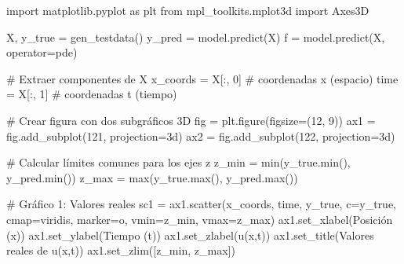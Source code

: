 \documentclass[
  spanish,
  us-letterpaper,
]{scrreprt}
\newenvironment{Shaded}{\begin{snugshade}}{\end{snugshade}}
\newcommand{\BuiltInTok}[1]{\textcolor[rgb]{0.00,0.23,0.31}{#1}}
\newcommand{\CommentTok}[1]{\textcolor[rgb]{0.37,0.37,0.37}{#1}}
\newcommand{\DecValTok}[1]{\textcolor[rgb]{0.68,0.00,0.00}{#1}}
\newcommand{\ImportTok}[1]{\textcolor[rgb]{0.00,0.46,0.62}{#1}}
\newcommand{\NormalTok}[1]{\textcolor[rgb]{0.00,0.23,0.31}{#1}}
\newcommand{\OperatorTok}[1]{\textcolor[rgb]{0.37,0.37,0.37}{#1}}
\newcommand{\StringTok}[1]{\textcolor[rgb]{0.13,0.47,0.30}{#1}}
\theoremstyle{plain}
\theoremstyle{definition}
\theoremstyle{remark}
\begin{document}
\begin{Shaded}
\begin{Highlighting}[]
\ImportTok{import}\NormalTok{ matplotlib.pyplot }\ImportTok{as}\NormalTok{ plt }
\ImportTok{from}\NormalTok{ mpl\_toolkits.mplot3d }\ImportTok{import}\NormalTok{ Axes3D}

\NormalTok{X, y\_true }\OperatorTok{=}\NormalTok{ gen\_testdata()}
\NormalTok{y\_pred }\OperatorTok{=}\NormalTok{ model.predict(X)}
\NormalTok{f }\OperatorTok{=}\NormalTok{ model.predict(X, operator}\OperatorTok{=}\NormalTok{pde)}

\CommentTok{\# Extraer componentes de X}
\NormalTok{x\_coords }\OperatorTok{=}\NormalTok{ X[:, }\DecValTok{0}\NormalTok{]  }\CommentTok{\# coordenadas x (espacio)}
\NormalTok{time }\OperatorTok{=}\NormalTok{ X[:, }\DecValTok{1}\NormalTok{]      }\CommentTok{\# coordenadas t (tiempo)}

\CommentTok{\# Crear figura con dos subgráficos 3D}
\NormalTok{fig }\OperatorTok{=}\NormalTok{ plt.figure(figsize}\OperatorTok{=}\NormalTok{(}\DecValTok{12}\NormalTok{, }\DecValTok{9}\NormalTok{))}
\NormalTok{ax1 }\OperatorTok{=}\NormalTok{ fig.add\_subplot(}\DecValTok{121}\NormalTok{, projection}\OperatorTok{=}\StringTok{\textquotesingle{}3d\textquotesingle{}}\NormalTok{)}
\NormalTok{ax2 }\OperatorTok{=}\NormalTok{ fig.add\_subplot(}\DecValTok{122}\NormalTok{, projection}\OperatorTok{=}\StringTok{\textquotesingle{}3d\textquotesingle{}}\NormalTok{)}

\CommentTok{\# Calcular límites comunes para los ejes z}
\NormalTok{z\_min }\OperatorTok{=} \BuiltInTok{min}\NormalTok{(y\_true.}\BuiltInTok{min}\NormalTok{(), y\_pred.}\BuiltInTok{min}\NormalTok{())}
\NormalTok{z\_max }\OperatorTok{=} \BuiltInTok{max}\NormalTok{(y\_true.}\BuiltInTok{max}\NormalTok{(), y\_pred.}\BuiltInTok{max}\NormalTok{())}

\CommentTok{\# Gráfico 1: Valores reales}
\NormalTok{sc1 }\OperatorTok{=}\NormalTok{ ax1.scatter(x\_coords, time, y\_true, c}\OperatorTok{=}\NormalTok{y\_true,}
\NormalTok{                cmap}\OperatorTok{=}\StringTok{\textquotesingle{}viridis\textquotesingle{}}\NormalTok{, marker}\OperatorTok{=}\StringTok{\textquotesingle{}o\textquotesingle{}}\NormalTok{, vmin}\OperatorTok{=}\NormalTok{z\_min, vmax}\OperatorTok{=}\NormalTok{z\_max)}
\NormalTok{ax1.set\_xlabel(}\StringTok{\textquotesingle{}Posición (x)\textquotesingle{}}\NormalTok{)}
\NormalTok{ax1.set\_ylabel(}\StringTok{\textquotesingle{}Tiempo (t)\textquotesingle{}}\NormalTok{)}
\NormalTok{ax1.set\_zlabel(}\StringTok{\textquotesingle{}u(x,t)\textquotesingle{}}\NormalTok{)}
\NormalTok{ax1.set\_title(}\StringTok{\textquotesingle{}Valores reales de u(x,t)\textquotesingle{}}\NormalTok{)}
\NormalTok{ax1.set\_zlim([z\_min, z\_max])}


\end{Highlighting}
\end{Shaded}
\end{document}
